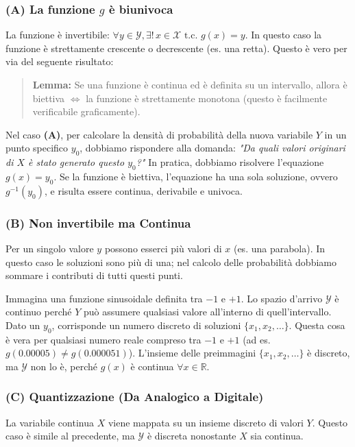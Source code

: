 \subsubsection{(A) La funzione $g$ è biunivoca}
La funzione è invertibile: $\forall y \in \mathcal{Y}, \exists ! \, x \in \mathcal{X} \text{ t.c. } g(x) = y$.
In questo caso la funzione è strettamente crescente o decrescente (es. una retta). Questo è vero per via del seguente risultato:

\begin{quote}
\textbf{Lemma:} Se una funzione è continua ed è definita su un intervallo, allora è biettiva $\iff$ la funzione è strettamente monotona (questo è facilmente verificabile graficamente).
\end{quote}

Nel caso \textbf{(A)}, per calcolare la densità di probabilità della nuova variabile $Y$ in un punto specifico $y_0$, dobbiamo rispondere alla domanda: \textit{"Da quali valori originari di $X$ è stato generato questo $y_0$?"}
In pratica, dobbiamo risolvere l'equazione $g(x) = y_0$. Se la funzione è biettiva, l'equazione ha una sola soluzione, ovvero $g^{-1}(y_0)$, e risulta essere continua, derivabile e univoca.

\subsubsection{(B) Non invertibile ma Continua}
Per un singolo valore $y$ possono esserci più valori di $x$ (es. una parabola). In questo caso le soluzioni sono più di una; nel calcolo delle probabilità dobbiamo sommare i contributi di tutti questi punti.

Immagina una funzione sinusoidale definita tra $-1$ e $+1$. Lo spazio d'arrivo $\mathcal{Y}$ è continuo perché $Y$ può assumere qualsiasi valore all'interno di quell'intervallo.
Dato un $y_0$, corrisponde un numero discreto di soluzioni $\{x_1, x_2, \dots\}$. Questa cosa è vera per qualsiasi numero reale compreso tra $-1$ e $+1$ (ad es. $g(0.00005) \neq g(0.000051)$). 
L'insieme delle preimmagini $\{x_1, x_2, \dots\}$ è discreto, ma $\mathcal{Y}$ non lo è, perché $g(x)$ è continua $\forall x \in \mathbb{R}$.

\subsubsection{(C) Quantizzazione (Da Analogico a Digitale)}
La variabile continua $X$ viene mappata su un insieme discreto di valori $Y$. Questo caso è simile al precedente, ma $\mathcal{Y}$ è discreta nonostante $X$ sia continua. 

